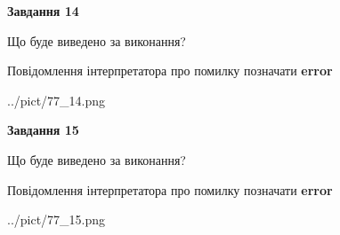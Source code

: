 \documentclass[11pt, ukrainian]{article}
\begin{document}
{\begin {large}
{\begin {center}\textbf{Завдання 14}\end {center}}\par
Що буде виведено за виконання? \par
Повідомлення інтерпретатора про помилку позначати \textbf{error}

\begin{center}
	{../pict/77_14.png}
\end{center}
\newpage

{\begin {center}\textbf{Завдання 15}\end {center}}\par
Що буде виведено за виконання? \par
Повідомлення інтерпретатора про помилку позначати \textbf{error}

\begin{center}
	{../pict/77_15.png}
\end{center}
\newpage

\end {large}}
\end{document}
